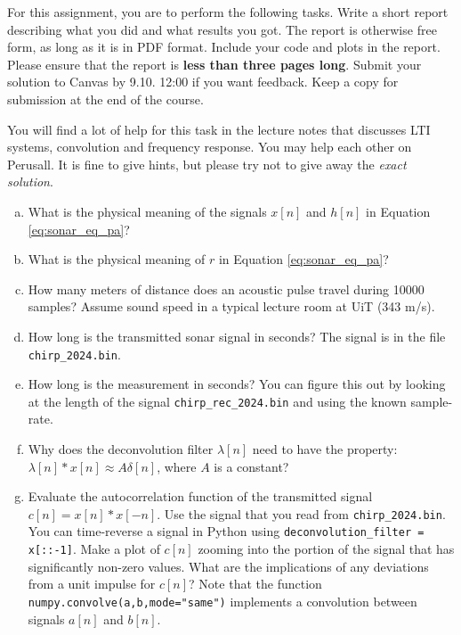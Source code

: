 For this assignment, you are to perform the following tasks. Write a
short report describing what you did and what results you got. The
report is otherwise free form, as long as it is in PDF format. Include
your code and plots in the report. Please ensure that the report is
\textbf{less than three pages long}. Submit your solution to Canvas by
9.10. 12:00 if you want feedback. Keep a copy for submission at the
end of the course.

You will find a lot of help for this task in the lecture notes that
discusses LTI systems, convolution and frequency response. You may
help each other on Perusall. It is fine to give hints, but please try
not to give away the \emph{exact solution}.

\begin{enumerate}[a)]
  
\item What is the physical meaning of the signals $x[n]$ and $h[n]$ in
  Equation \ref{eq:sonar_eq_pa}?
  
\item What is the physical meaning of $r$ in Equation
  \ref{eq:sonar_eq_pa}?
  
\item How many meters of distance does an acoustic pulse travel during
  10000 samples? Assume sound speed in a typical lecture room
  at UiT (343 m/s).
  
\item How long is the transmitted sonar signal in seconds? The signal
  is in the file \verb|chirp_2024.bin|.

\item How long is the measurement in seconds? You can figure this out
  by looking at the length of the signal \verb|chirp_rec_2024.bin| and
  using the known sample-rate.
    
\item Why does the deconvolution filter $\lambda[n]$ need to have the
  property: $\lambda[n]*x[n] \approx A\delta[n]$, where $A$ is a constant?
   
\item Evaluate the autocorrelation function of the transmitted signal
  $c[n]=x[n]*x[-n]$. Use the signal that you read from
  \verb|chirp_2024.bin|. You can time-reverse a signal in Python using
  \verb|deconvolution_filter = x[::-1]|. Make a plot of $c[n]$ zooming
  into the portion of the signal that has significantly non-zero
  values. What are the implications of any deviations from a unit
  impulse for $c[n]$? Note that the function
  \verb|numpy.convolve(a,b,mode="same")| implements a convolution
  between signals $a[n]$ and $b[n]$.


\end{enumerate}
